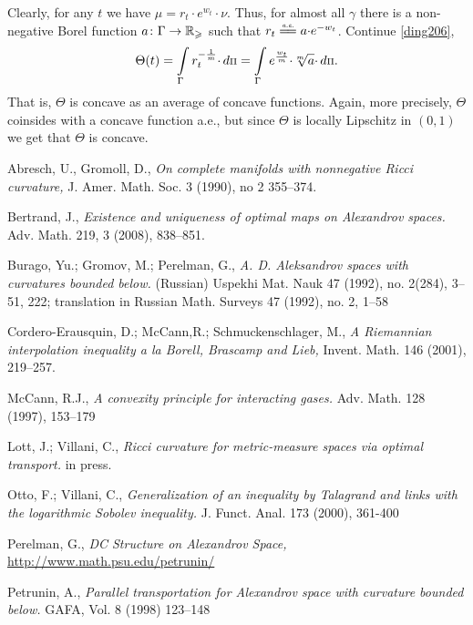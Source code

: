 \documentclass[oneside,a4paper]{article}
\begin{document}
Clearly, for any $t$ we have
$\mu=r_t{\cdot} e^{w_t}{\cdot}\nu$.
Thus, for almost all $\gamma$ there is a non-negative Borel function $a\colon\Gamma\to\mathbb{R}_\geqslant$ such that $r_t\ae a {\cdot}e^{-w_t}$.
Continue \ref{ding206},
$$\Theta(t)
=
\int\limits_\Gamma r_t^{-\frac1m}{\cdot}\,d\text{\scriptsize $\Pi$}
=
\int\limits_\Gamma{e^{\frac{w_t}m}}{\cdot}{\sqrt[m]{a}}{\cdot}\,d\text{\scriptsize $\Pi$}.
$$
That is, $\Theta$ is concave as an average of concave functions.
Again, more precisely, $\Theta$ coinsides with a concave function a.e., but since $\Theta$ is locally Lipschitz in $(0,1)$ we get that $\Theta$ is concave. \qeds




\begin{thebibliography}{3} 
 Abresch, U., Gromoll, D., \textit{On complete manifolds with nonnegative Ricci curvature,} J. Amer. Math. Soc. 3 (1990), no 2 355--374.

Bertrand, J., \textit{Existence and uniqueness of optimal maps on Alexandrov spaces.}
Adv. Math. 219, 3 (2008), 838--851.

 Burago, Yu.; Gromov, M.; Perelman, G., \textit{A. D. Aleksandrov spaces
with curvatures bounded below.} (Russian)  Uspekhi Mat. Nauk  47  (1992),  no.
2(284), 3--51, 222;  translation in  Russian Math. Surveys  47  (1992),  no. 2, 1--58

 Cordero-Erausquin, D.; McCann,R.;  Schmuckenschlager, M., \textit{A Riemannian interpolation inequality a la Borell, Brascamp and Lieb,} Invent. Math. 146 (2001), 219--257.

 McCann, R.J., \textit{A convexity principle for interacting gases.}
Adv. Math. 128 (1997), 153--179

 Lott, J.; Villani, C., \textit{Ricci curvature for metric-measure spaces via optimal transport.} in press.

 Otto, F.;  Villani, C., \textit{Generalization of an inequality by Talagrand and links
with the logarithmic Sobolev inequality.}
J. Funct. Anal. 173 (2000), 361-400


 Perelman, G., \textit{DC Structure on Alexandrov Space,}\\ \href{http://www.math.psu.edu/petrunin/papers/papers.html}{http://www.math.psu.edu/petrunin/}

 Petrunin, A., \textit{Parallel transportation for Alexandrov space with curvature bounded below.}  GAFA, Vol. 8 (1998) 123--148


\end{thebibliography}
\end{document}
